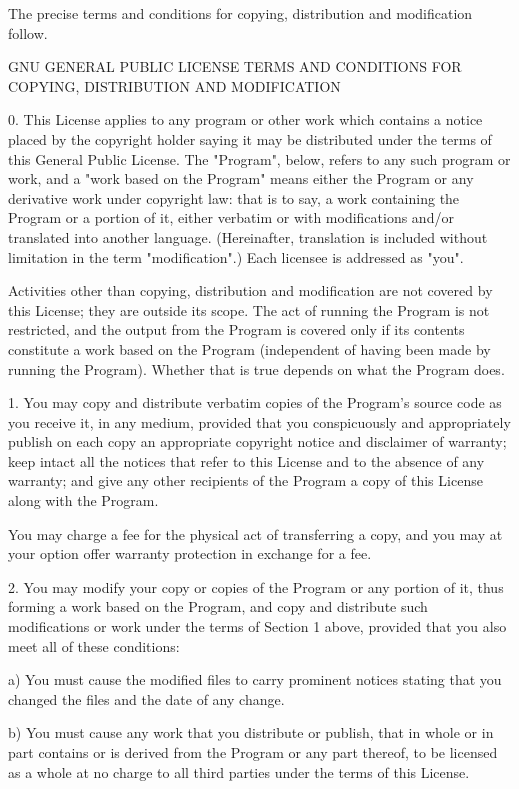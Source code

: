 \documentclass{doc}
\begin{document}
  The precise terms and conditions for copying, distribution and
modification follow.

		    GNU GENERAL PUBLIC LICENSE
   TERMS AND CONDITIONS FOR COPYING, DISTRIBUTION AND MODIFICATION

  0. This License applies to any program or other work which contains
a notice placed by the copyright holder saying it may be distributed
under the terms of this General Public License.  The "Program", below,
refers to any such program or work, and a "work based on the Program"
means either the Program or any derivative work under copyright law:
that is to say, a work containing the Program or a portion of it,
either verbatim or with modifications and/or translated into another
language.  (Hereinafter, translation is included without limitation in
the term "modification".)  Each licensee is addressed as "you".

Activities other than copying, distribution and modification are not
covered by this License; they are outside its scope.  The act of
running the Program is not restricted, and the output from the Program
is covered only if its contents constitute a work based on the
Program (independent of having been made by running the Program).
Whether that is true depends on what the Program does.

  1. You may copy and distribute verbatim copies of the Program's
source code as you receive it, in any medium, provided that you
conspicuously and appropriately publish on each copy an appropriate
copyright notice and disclaimer of warranty; keep intact all the
notices that refer to this License and to the absence of any warranty;
and give any other recipients of the Program a copy of this License
along with the Program.

You may charge a fee for the physical act of transferring a copy, and
you may at your option offer warranty protection in exchange for a fee.

  2. You may modify your copy or copies of the Program or any portion
of it, thus forming a work based on the Program, and copy and
distribute such modifications or work under the terms of Section 1
above, provided that you also meet all of these conditions:

    a) You must cause the modified files to carry prominent notices
    stating that you changed the files and the date of any change.

    b) You must cause any work that you distribute or publish, that in
    whole or in part contains or is derived from the Program or any
    part thereof, to be licensed as a whole at no charge to all third
    parties under the terms of this License.
\end{document}
